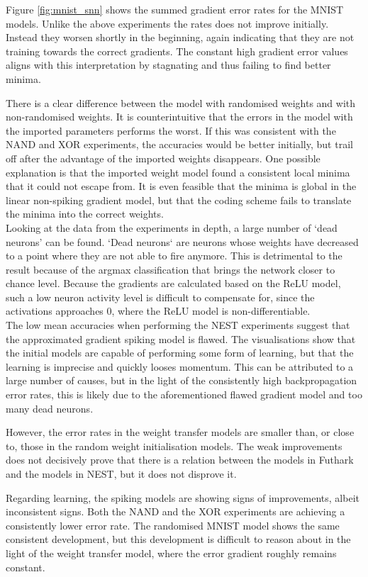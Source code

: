 \documentclass[report.tex]{subfiles}
\begin{document}
Figure \ref{fig:mnist_snn} shows the summed gradient error rates for the MNIST
models.
Unlike the above experiments the rates does not improve initially.
Instead they worsen shortly in the beginning, again indicating that they are not training towards
the correct gradients.
The constant high gradient error values aligns with this interpretation by
stagnating and thus failing to find better minima.

There is a clear difference between the model with randomised weights and with
non-randomised weights.
It is counterintuitive that the errors in the model with the imported parameters
performs the worst.
If this was consistent with the NAND and XOR experiments, the accuracies would
be better initially, but trail off after the advantage of the
imported weights disappears.
One possible explanation is that the imported weight model found a consistent
local minima that it could not escape from.
It is even feasible that the minima is global in the linear non-spiking gradient
model, but that the coding scheme fails to translate the minima into the correct
weights.
\\[0.1cm]

Looking at the data from the experiments in depth, a large number of 
`dead neurons' can be found.
`Dead neurons` are neurons whose weights have decreased to a point where they are not able to
fire anymore.
This is detrimental to the result because of the argmax classification that
brings the network closer to chance level.
Because the gradients are calculated based on the ReLU model, such a low neuron
activity level is difficult to compensate for, since the activations approaches
0, where the ReLU model is non-differentiable.
\\[0.1cm]

The low mean accuracies when performing the NEST experiments suggest that the approximated
gradient spiking model is flawed.
The visualisations show that the initial models are capable of performing some form of
learning, but that the learning is imprecise and quickly looses
momentum.
This can be attributed to a large number of causes, but in the light of the
consistently high backpropagation error rates, this is likely due to the
aforementioned flawed gradient model and too many dead neurons.

However, the error rates in the weight transfer models are smaller than, or
close to, those in the random weight initialisation models.
The weak improvements does not decisively prove that there is a relation between
the models in Futhark and the models in NEST, but it does not disprove it.

Regarding learning, the spiking models are showing signs of 
improvements, albeit inconsistent signs. 
Both the NAND and the XOR experiments are achieving a consistently lower error
rate.
The randomised MNIST model shows the same consistent development, but this
development is difficult to reason about in the light of the weight transfer
model, where the error gradient roughly remains constant.
\end{document}
